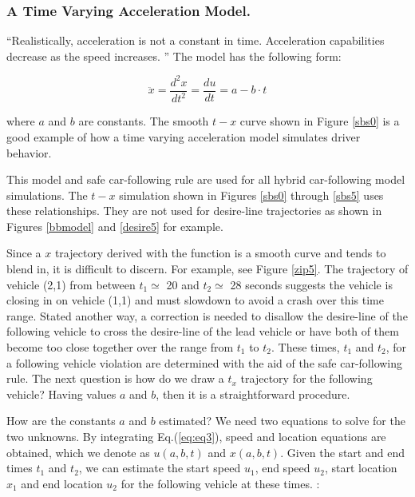 \documentclass[Proceedings]{ascelike}
\begin{document}
\subsubsection{A Time Varying Acceleration Model.}

 ``Realistically, acceleration is not a constant in time. Acceleration capabilities decrease as the speed increases. \cite{LiliBook}''  The model has the following form:

\begin {equation}
 \ddot{x} = \frac{d^2x}{dt^2} = \frac{du}{dt} =  a - b \cdot t \label{eq:eq3}
\end{equation}

\noindent where $a$ and $b$ are constants.  The smooth $t-x$ curve shown in Figure \ref{sbs0} is a good example of how a time varying acceleration model simulates driver behavior. 


This model and safe car-following rule are used for all hybrid car-following model simulations. The $t-x$ simulation shown in Figures \ref{sbs0} through \ref{sbs5} uses these relationships. They are not used for desire-line trajectories as shown in Figures \ref{bbmodel} and \ref{desire5} for example. 

Since a $x$ trajectory derived with the function is a smooth curve and tends to blend in, it is difficult to discern.  For example, see Figure \ref{zip5}. The trajectory of vehicle (2,1) from between $t_1 \simeq$ 20 and $t_2 \simeq$ 28 seconds suggests the vehicle is closing in on vehicle (1,1) and must slowdown to avoid a crash over this time range. Stated another way, a correction is needed to disallow the desire-line of the following vehicle to cross the desire-line of the lead vehicle or have both of them become too close together over the range from  $t_1$ to $t_2$. These times, $t_1$ and $t_2$, for a following vehicle violation are determined with the aid of the safe car-following rule. The next question is how do we draw a $t_x$ trajectory for the following vehicle?  Having values $a$ and $b$, then it is a straightforward procedure. 

How  are the constants $a$ and $b$ estimated? We need two equations to solve for the two unknowns. By integrating Eq.(\ref{eq:eq3}), speed and location equations are obtained, which we denote as $u(a,b,t)$ and $x(a,b,t)$. Given the start and end times $t_1$ and $t_2$, we can estimate the start speed $u_1$, end speed $u_2$, start location $x_1$ and end location $u_2$ for the following vehicle at these times. :
\end{document}
